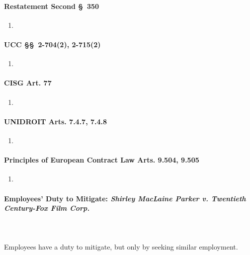 \paragraph{Restatement Second \S\ 350}

\begin{enumerate}
    \item %
\end{enumerate}

\paragraph{UCC \S\S\ 2-704(2), 2-715(2)}

\begin{enumerate}
    \item %
\end{enumerate}

\paragraph{CISG Art. 77}

\begin{enumerate}
    \item %
\end{enumerate}

\paragraph{UNIDROIT Arts. 7.4.7, 7.4.8}

\begin{enumerate}
    \item %
\end{enumerate}

\paragraph{Principles of European Contract Law Arts. 9.504, 9.505}

\begin{enumerate}
    \item %
\end{enumerate}

\paragraph{Employees' Duty to Mitigate: \emph{Shirley MacLaine Parker v. 
Twentieth Century-Fox Film Corp.}}
~\\\\
Employees have a duty to mitigate, but only by seeking similar employment.

